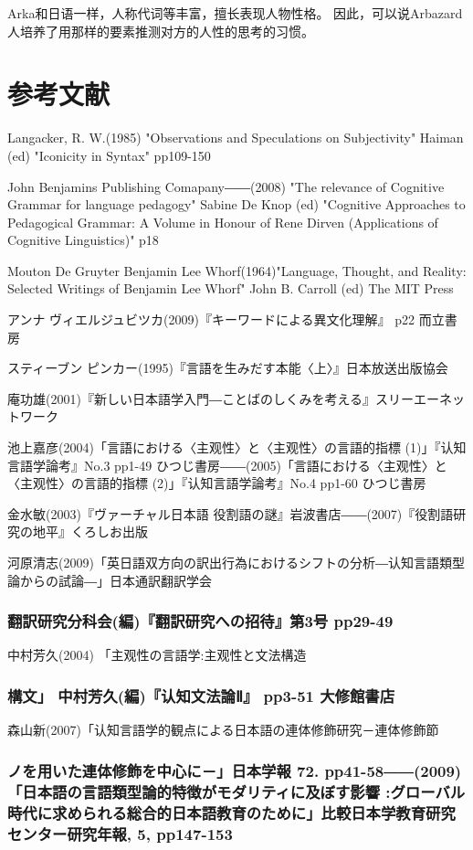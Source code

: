 Arka和日语一样，人称代词等丰富，擅长表现人物性格。
因此，可以说Arbazard人培养了用那样的要素推测对方的人性的思考的习惯。
\section{参考文献}
Langacker, R. W.(1985) "Observations and Speculations on Subjectivity" 
Haiman (ed) "Iconicity in Syntax" pp109-150

John Benjamins Publishing Comapany――(2008) "The relevance of Cognitive Grammar for language pedagogy" 
Sabine De Knop (ed) "Cognitive Approaches to Pedagogical Grammar: A Volume in Honour of Rene Dirven 
(Applications of Cognitive Linguistics)" p18 

Mouton De Gruyter Benjamin Lee Whorf(1964)"Language, Thought, and Reality: Selected Writings of Benjamin Lee Whorf" 
John B. Carroll (ed) The MIT Press

アンナ ヴィエルジュビツカ(2009)『キーワードによる異文化理解』 p22 而立書房

スティーブン ピンカー(1995)『言語を生みだす本能〈上〉』日本放送出版協会

庵功雄(2001)『新しい日本語学入門―ことばのしくみを考える』スリーエーネットワーク

池上嘉彦(2004)「言語における〈主观性〉と〈主观性〉の言語的指標 (1)」『认知言語学論考』No.3 pp1-49 ひつじ書房――(2005)「言語における〈主观性〉と〈主观性〉の言語的指標 (2)」『认知言語学論考』No.4 pp1-60 ひつじ書房

金水敏(2003)『ヴァーチャル日本語 役割語の謎』岩波書店――(2007)『役割語研究の地平』くろしお出版

河原清志(2009)「英日語双方向の訳出行為におけるシフトの分析―认知言語類型論からの試論―」日本通訳翻訳学会\subsubsection{翻訳研究分科会(編)『翻訳研究への招待』第3号 pp29-49}

中村芳久(2004) 「主观性の言語学:主观性と文法構造\subsubsection{構文」 中村芳久(編)『认知文法論Ⅱ』 pp3-51 大修館書店}

森山新(2007)「认知言語学的観点による日本語の連体修飾研究－連体修飾節\subsubsection{ノを用いた連体修飾を中心に－」日本学報 72. pp41-58――(2009)「日本語の言語類型論的特徴がモダリティに及ぼす影響 :グローバル時代に求められる総合的日本語教育のために」比較日本学教育研究センター研究年報, 5, pp147-153}
